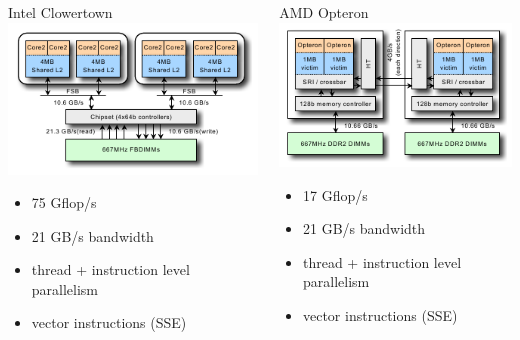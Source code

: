 \begin{frame} %
  \begin{columns}
    \begin{column}{0.5\textwidth}
      {\centering Intel Clowertown \\
      \includegraphics[width=\textwidth]{figures/hardware/IntelClovertown} }
    \begin{itemize}
    \item 75 Gflop/s
    \item 21 GB/s bandwidth
    \item thread + instruction level parallelism
    \item vector instructions (SSE)
    \end{itemize}
    \end{column}
    \begin{column}{0.5\textwidth}
      {\centering       AMD Opteron \\
      \includegraphics[width=\textwidth]{figures/hardware/AMDOpteron} }
    \begin{itemize}
    \item 17 Gflop/s
    \item 21 GB/s bandwidth
    \item thread + instruction level parallelism
    \item vector instructions (SSE)
    \end{itemize}
    \end{column}
  \end{columns}
\end{frame}
